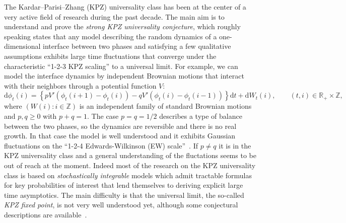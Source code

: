 \documentclass[11pt, a4paper]{article}
\newcommand{\R}{\mathbb{R}}
\newcommand{\1}{\mathbf{1}}
\newcommand{\Z}{\mathbb{Z}}
\begin{document}
The Kardar--Parisi--Zhang (KPZ) universality class has been at the center of a very active field of research during the past decade. The main aim is to understand and prove the \emph{strong KPZ universality conjecture}, which roughly speaking states that any model describing the random dynamics of a one-dimensional interface between two phases and satisfying a few qualitative assumptions exhibits large time fluctuations that converge under the characteristic ``1-2-3 KPZ scaling'' to a universal limit. For example, we can model the interface dynamics by independent Brownian motions that interact with their neighbors through a potential function $V$:
\begin{equation}\label{eq:general}
   \mathrm{d}\phi_t (i) = \left\{ pV' (\phi_t (i + 1) - \phi_t (i)) - qV' (\phi_t (i) - \phi_t (i-1)) \right\} \mathrm{d}t + \mathrm{d}W_t (i), \qquad (t,i) \in \R_+ \times \Z,
\end{equation}
where $(W (i) : i \in \mathbb{Z})$ is an independent family of standard Brownian motions and $p,q \ge 0$ with $p+q=1$. The case $p=q=1/2$ describes a type of balance between the two phases, so the dynamics are reversible and there is no real growth. In that case the model is well understood and it exhibits Gaussian fluctuations on the ``1-2-4 Edwards-Wilkinson (EW) scale''~\cite{bib:spohn, bib:zhu, bib:changYau}. If $p \neq q$ it is in the KPZ universality class and a general understanding of the fluctations seems to be out of reach at the moment. Indeed most of the research on the KPZ universality class is based on \emph{stochastically integrable} models which admit tractable formulas for key probabilities of interest that lend themselves to deriving explicit large time asymptotics. The main difficulty is that the universal limit, the so-called \emph{KPZ fixed point}, is not very well understood yet, although some conjectural descriptions are available~\cite{bib:corwinQuastelRemenik}.
\end{document}
